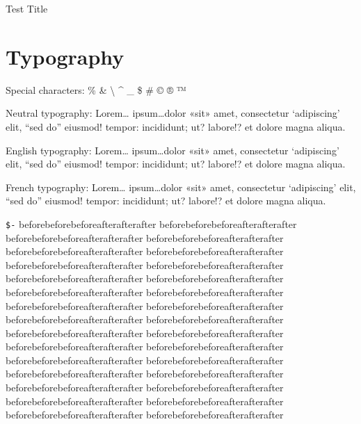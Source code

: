 \documentclass[demo]{pyscribe}
\begin{document}
\begin{center}
{\Large Test Title\par}
\end{center}
\newpage

\renewcommand\contentsname{Sommaire}
\tableofcontents



\chapter{Typography}

Special characters: \% \& \textbackslash{} \string^ \_ \$ \# © ® ™

Neutral typography: Lorem\dots{} ipsum\dots{}dolor «sit» amet, consectetur `adipiscing' elit, “sed do” eiusmod! tempor: incididunt; ut? labore!? et dolore magna aliqua. \par
English typography: Lorem\dots{} ipsum\dots{}dolor «sit» amet, consectetur `adipiscing' elit, “sed do” eiusmod! tempor: incididunt; ut? labore!? et dolore magna aliqua. \par
French typography: Lorem\dots{} ipsum\dots{}dolor «sit» amet, consectetur `adipiscing' elit, “sed do” eiusmod! tempor: incididunt; ut? labore!? et dolore magna aliqua. \par

\par\medskip
\texttt{\$-} beforebeforebefore\-afterafterafter beforebeforebefore\-afterafterafter beforebeforebefore\-afterafterafter beforebeforebefore\-afterafterafter beforebeforebefore\-afterafterafter beforebeforebefore\-afterafterafter beforebeforebefore\-afterafterafter beforebeforebefore\-afterafterafter beforebeforebefore\-afterafterafter beforebeforebefore\-afterafterafter beforebeforebefore\-afterafterafter beforebeforebefore\-afterafterafter beforebeforebefore\-afterafterafter beforebeforebefore\-afterafterafter beforebeforebefore\-afterafterafter beforebeforebefore\-afterafterafter beforebeforebefore\-afterafterafter beforebeforebefore\-afterafterafter beforebeforebefore\-afterafterafter beforebeforebefore\-afterafterafter beforebeforebefore\-afterafterafter beforebeforebefore\-afterafterafter beforebeforebefore\-afterafterafter beforebeforebefore\-afterafterafter beforebeforebefore\-afterafterafter beforebeforebefore\-afterafterafter beforebeforebefore\-afterafterafter beforebeforebefore\-afterafterafter beforebeforebefore\-afterafterafter beforebeforebefore\-afterafterafter 
\end{document}
